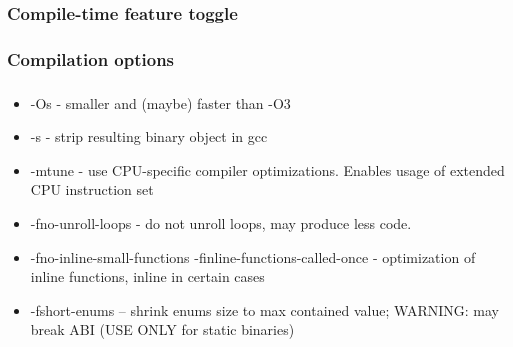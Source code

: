 \documentclass{beamer}
\begin{document}
\subsubsection{Compile-time feature toggle}

\begin{frame}
\frametitle{\subsubsecname}
	\begin{multicols}{2}



	\end{multicols}
\end{frame}

\subsubsection{Compilation options}
\begin{frame}
\frametitle{\subsubsecname}
\begin{itemize}
	\item -Os - smaller and (maybe) faster than -O3 
	\item -s - strip resulting binary object in gcc
	\item -mtune - use CPU-specific compiler optimizations. Enables usage of extended CPU instruction set
	\item -fno-unroll-loops - do not unroll loops, may produce less code.
	\item -fno-inline-small-functions -finline-functions-called-once - optimization of inline functions, inline in certain cases
	\item -fshort-enums – shrink enums size to max contained value; WARNING: may break ABI (USE ONLY for static binaries)
\end{itemize}
\end{frame}
\end{document}
